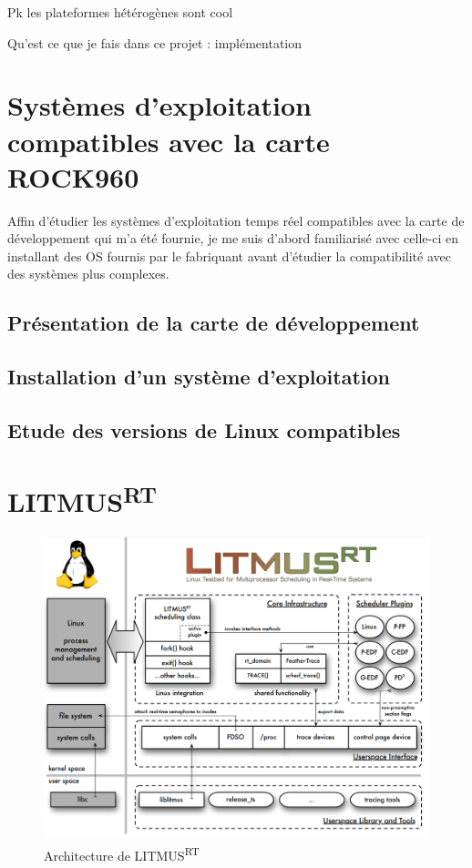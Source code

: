 \documentclass{article}
\newcommand{\litmus}{LITMUS\textsuperscript{RT}}
\begin{document}
    Pk les plateformes hétérogènes sont cool

    Qu'est ce que je fais dans ce projet : implémentation

    \newpage
    \section[OS compatibles avec la carte]{Systèmes d'exploitation compatibles avec la carte ROCK960}

    Affin d'étudier les systèmes d'exploitation temps réel compatibles avec la carte de développement qui m'a été fournie, je me suis d'abord familiarisé avec celle-ci en installant des OS fournis par le fabriquant avant d'étudier la compatibilité avec des systèmes plus complexes.


    \subsection{Présentation de la carte de développement}
    

    \subsection{Installation d'un système d'exploitation}
    

    \subsection{Etude des versions de Linux compatibles}
    




    
    \newpage
    \section{\litmus}
    \label{section:litmus}
    
\begin{figure}[H]
    \centering
    \includegraphics[width=0.5\paperwidth]{Images/litmusrtarchitecture.png}
    \caption{Architecture de \litmus}
    \label{fig:litmusrtarchitecture}
\end{figure}
\end{document}
